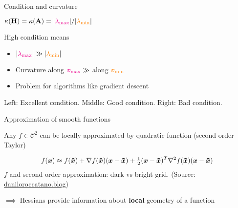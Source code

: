 \documentclass[11pt,compress,t,notes=noshow, xcolor=table]{beamer}
\begin{document}
\begin{framei}{Condition and curvature}
\item $\kappa(\mathbf{H}) = \kappa(\mathbf{A}) = |\textcolor{magenta}{\lambda_\text{max}}| / |\textcolor{orange}{\lambda_\text{min}}|$
\item High condition means
\begin{itemize}
\item $|\textcolor{magenta}{\lambda_\text{max}}| \gg |\textcolor{orange}{\lambda_\text{min}}|$
\item Curvature along $\textcolor{magenta}{\bm{v}_\text{max}} \gg$ along $\textcolor{orange}{\bm{v}_\text{min}}$
\item Problem for algorithms like gradient descent
\end{itemize}
{\footnotesize Left: Excellent condition. Middle: Good condition. Right: Bad condition.}
\end{framei}

\begin{framei}{Approximation of smooth functions}
\item Any $f \in \mathcal{C}^2$ can be locally approximated by quadratic function (second order Taylor)
\item[] \begin{equation*}
f(\bm{x}) \approx f(\bm{\tilde{x}}) + \nabla f(\bm{\tilde{x}})(\bm{x}-\bm{\tilde{x}}) + \tfrac 12(\bm{x}-\bm{\tilde{x}})^T\nabla^2 f(\bm{\tilde{x}})(\bm{x}-\bm{\tilde{x}})
\end{equation*}
{\footnotesize $f$ and second order approximation: dark vs bright grid. (Source: \url{daniloroccatano.blog})}
\item $\implies$ Hessians provide information about \textbf{local} geometry of a function
\end{framei}
  
\endlecture
\end{document}
